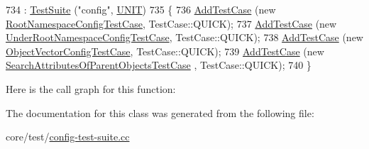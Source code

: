 \begin{DoxyCode}
734   : \hyperlink{classns3_1_1TestSuite_a904b0c40583b744d30908aeb94636d1a}{TestSuite} (\textcolor{stringliteral}{"config"}, \hyperlink{classns3_1_1TestSuite_a1ebfcab34ec8161e085e8e3a1855eae0a3885375a3787abf60431f8454b3cadbd}{UNIT})
735 \{
736   \hyperlink{classns3_1_1TestCase_a3718088e3eefd5d6454569d2e0ddd835}{AddTestCase} (\textcolor{keyword}{new} \hyperlink{classRootNamespaceConfigTestCase}{RootNamespaceConfigTestCase}, TestCase::QUICK);
737   \hyperlink{classns3_1_1TestCase_a3718088e3eefd5d6454569d2e0ddd835}{AddTestCase} (\textcolor{keyword}{new} \hyperlink{classUnderRootNamespaceConfigTestCase}{UnderRootNamespaceConfigTestCase}, 
      TestCase::QUICK);
738   \hyperlink{classns3_1_1TestCase_a3718088e3eefd5d6454569d2e0ddd835}{AddTestCase} (\textcolor{keyword}{new} \hyperlink{classObjectVectorConfigTestCase}{ObjectVectorConfigTestCase}, TestCase::QUICK);
739   \hyperlink{classns3_1_1TestCase_a3718088e3eefd5d6454569d2e0ddd835}{AddTestCase} (\textcolor{keyword}{new} \hyperlink{classSearchAttributesOfParentObjectsTestCase}{SearchAttributesOfParentObjectsTestCase}
      , TestCase::QUICK);
740 \}
\end{DoxyCode}


Here is the call graph for this function\+:




The documentation for this class was generated from the following file\+:\begin{DoxyCompactItemize}
\item 
core/test/\hyperlink{config-test-suite_8cc}{config-\/test-\/suite.\+cc}\end{DoxyCompactItemize}
